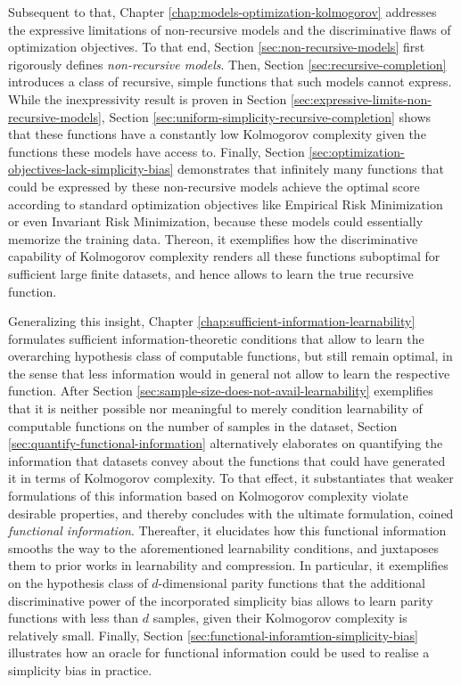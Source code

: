 Subsequent to that, Chapter \ref{chap:models-optimization-kolmogorov} addresses the expressive limitations of non-recursive models and the discriminative flaws of optimization objectives.
To that end, Section \ref{sec:non-recursive-models} first rigorously defines \textit{non-recursive models}.
Then, Section \ref{sec:recursive-completion} introduces a class of recursive, simple functions that such models cannot express.
While the inexpressivity result is proven in Section \ref{sec:expressive-limits-non-recursive-models}, Section \ref{sec:uniform-simplicity-recursive-completion} shows that these functions have a constantly low Kolmogorov complexity given the functions these models have access to.
Finally, Section \ref{sec:optimization-objectives-lack-simplicity-bias} demonstrates that infinitely many functions that could be expressed by these non-recursive models achieve the optimal score according to standard optimization objectives like Empirical Risk Minimization or even Invariant Risk Minimization, because these models could essentially memorize the training data.
Thereon, it exemplifies how the discriminative capability of Kolmogorov complexity renders all these functions suboptimal for sufficient large finite datasets, and hence allows to learn the true recursive function.

Generalizing this insight, Chapter \ref{chap:sufficient-information-learnability} formulates sufficient information-theoretic conditions that allow to learn the overarching hypothesis class of computable functions, but still remain optimal, in the sense that less information would in general not allow to learn the respective function.
After Section \ref{sec:sample-size-does-not-avail-learnability} exemplifies that it is neither possible nor meaningful to merely condition learnability of computable functions on the number of samples in the dataset, Section \ref{sec:quantify-functional-information} alternatively elaborates on quantifying the information that datasets convey about the functions that could have generated it in terms of Kolmogorov complexity.
To that effect, it substantiates that weaker formulations of this information based on Kolmogorov complexity violate desirable properties, and thereby concludes with the ultimate formulation, coined \textit{functional information}.
Thereafter, it elucidates how this functional information smooths the way to the aforementioned learnability conditions, and juxtaposes them to prior works in learnability and compression. In particular, it exemplifies on the hypothesis class of $d$-dimensional parity functions that the additional discriminative power of the incorporated simplicity bias allows to learn parity functions with less than $d$ samples, given their Kolmogorov complexity is relatively small.
Finally, Section \ref{sec:functional-inforamtion-simplicity-bias} illustrates how an oracle for functional information could be used to realise a simplicity bias in practice.

